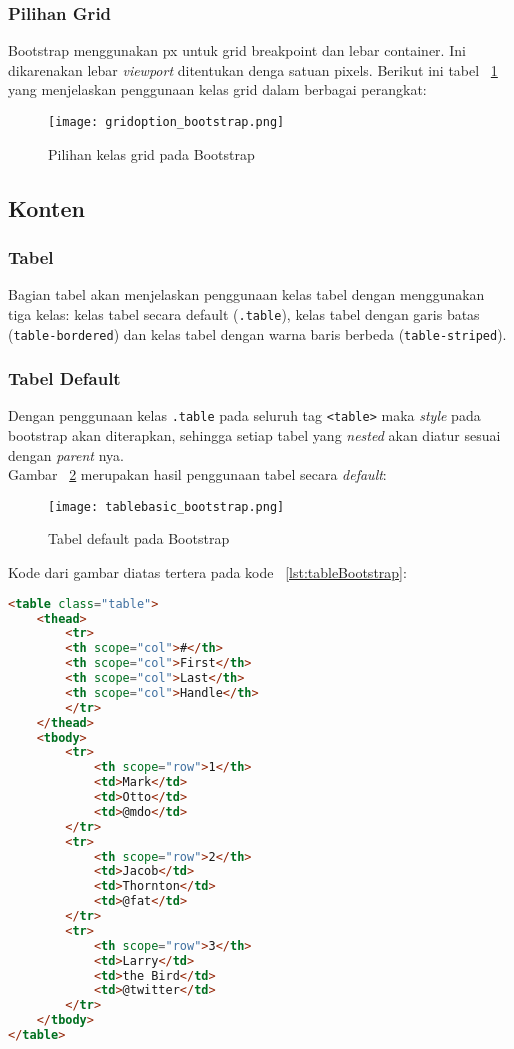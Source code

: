 \subsubsection{Pilihan Grid}
Bootstrap menggunakan px untuk grid breakpoint dan lebar container. Ini dikarenakan lebar \textit{viewport} ditentukan denga satuan pixels.
Berikut ini tabel ~\ref{fig:choiceGridBootstrap} yang menjelaskan penggunaan kelas grid dalam berbagai perangkat:
\begin{figure} [H]
	\centering  
	\texttt{[image: gridoption\_bootstrap.png]}  
	\caption{Pilihan kelas grid pada Bootstrap} 
	\label{fig:choiceGridBootstrap}
\end{figure}

\subsection{Konten}
\subsubsection{Tabel}
Bagian tabel akan menjelaskan penggunaan kelas tabel dengan menggunakan tiga kelas: kelas tabel secara default (\texttt{.table}), kelas tabel dengan garis batas (\texttt{table-bordered}) dan kelas tabel dengan warna baris berbeda (\texttt{table-striped}).
\subsubsection{Tabel Default}
Dengan penggunaan kelas \verb|.table| pada seluruh tag \texttt{<table>} maka \textit{style} pada bootstrap akan diterapkan, sehingga setiap tabel yang \textit{nested} akan diatur sesuai dengan \textit{parent} nya.\\
Gambar ~\ref{fig:tableBootstrap} merupakan hasil penggunaan tabel secara \textit{default}:
\begin{figure} [H]
	\centering  
	\texttt{[image: tablebasic\_bootstrap.png]}  
	\caption{Tabel default pada Bootstrap} 
	\label{fig:tableBootstrap}
\end{figure}

\noindent Kode dari gambar diatas tertera pada kode ~\ref{lst:tableBootstrap}:
\begin{lstlisting}[style=customhtml, language=HTML,  basicstyle=\ttfamily, frame=single, columns=fullflexible, keepspaces=true, breaklines=true, showstringspaces=false, label={lst:tableBootstrap}, caption=Tabel pada bootstrap 4] 
<table class="table">
	<thead>
		<tr>
		<th scope="col">#</th>
		<th scope="col">First</th>
		<th scope="col">Last</th>
		<th scope="col">Handle</th>
		</tr>
	</thead>
	<tbody>
		<tr>
			<th scope="row">1</th>
			<td>Mark</td>
			<td>Otto</td>
			<td>@mdo</td>
		</tr>
		<tr>
			<th scope="row">2</th>
			<td>Jacob</td>
			<td>Thornton</td>
			<td>@fat</td>
		</tr>
		<tr>
			<th scope="row">3</th>
			<td>Larry</td>
			<td>the Bird</td>
			<td>@twitter</td>
		</tr>
	</tbody>
</table>
\end{lstlisting}

